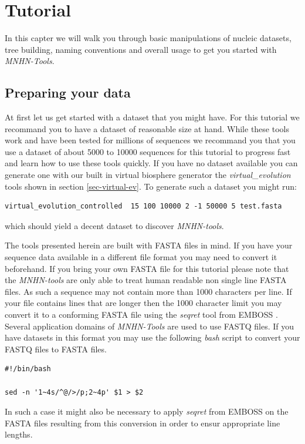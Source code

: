 \chapter{Tutorial}

In this capter we will walk you through basic manipulations of nucleic
datasets, tree building, naming conventions and overall usage to get
you started with \emph{MNHN-Tools}.

\section{Preparing your data}

At first let us get started with a dataset that you might have. For this
tutorial we recommand you to have a dataset of reasonable size at
hand. While these tools work and have been tested for millions of
sequences we recommand you that you use a dataset of about 5000 to
10000 sequences for this tutorial to progress fast and learn how to
use these tools quickly. If you have no dataset available you can
generate one with our built in virtual biosphere generator the
\emph{virtual\_evolution} tools shown in section
\ref{sec-virtual-ev}. To generate such a dataset you might run:
\begin{lstlisting}
virtual_evolution_controlled  15 100 10000 2 -1 50000 5 test.fasta
\end{lstlisting}
which should yield a decent dataset to discover \emph{MNHN-tools}.

The tools presented herein are built with FASTA \cite{fasta} files in mind. If
you have your sequence data available in a different file format you
may need to convert it beforehand. If you bring your own FASTA file
for this tutorial please note that the \emph{MNHN-tools} are only able
to treat human readable non single line FASTA files. 
As such a sequence may not contain more than 1000 characters per line.
If your file contains lines that are longer then the 1000 character
limit you may convert it to
a conforming FASTA file using the \emph{seqret} tool from EMBOSS
\cite{emboss}.
Several application domains of \emph{MNHN-Tools} are used to use FASTQ files.
If you have datasets in this format you may use the following
\emph{bash} script to convert your FASTQ files to FASTA files. 
\begin{lstlisting}
#!/bin/bash

sed -n '1~4s/^@/>/p;2~4p' $1 > $2
\end{lstlisting}
In such a case it might also be necessary to apply \emph{seqret} from
EMBOSS on the FASTA files resulting from this conversion in order to
ensur appropriate line lengths. 

